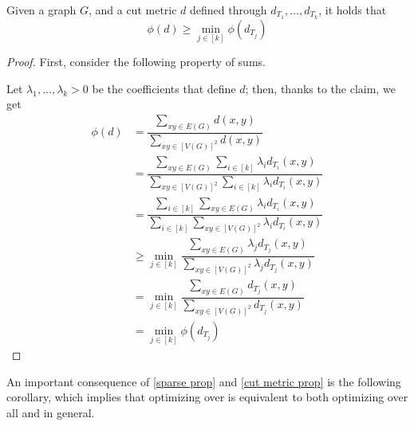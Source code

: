 \documentclass[a4paper, 12pt]{report}
\begin{document}
    \begin{framedprop}[label={cut metric prop}]{}
        Given a graph $G$, and a cut metric $d$ defined through $d_{T_1}, \ldots, d_{T_k}$, it holds that $$\phi(d) \ge \min_{j \in [k]}{\phi(d_{T_j})}$$
    \end{framedprop}

    \begin{proof}
        First, consider the following property of sums.


        Let $\lambda_1, \ldots, \lambda_k > 0$ be the coefficients that define $d$; then, thanks to the claim, we get
        \begin{equation*}
            \begin{split}
                \phi(d) &= \dfrac{\sum_{xy \in E(G)}{d(x, y)}}{\sum_{xy \in [V(G)]^2}{d(x, y)}} \\
                        &= \dfrac{\sum_{xy \in E(G)}{\sum_{i \in [k]}{\lambda_i d_{T_i}(x, y)}}}{\sum_{xy \in [V(G)]^2}{\sum_{i \in [k]}{\lambda_i d_{T_i}(x, y)}}} \\
                        &= \dfrac{\sum_{i \in [k]}{\sum_{xy \in E(G)}{\lambda_i d_{T_i}(x, y)}}}{\sum_{i \in [k]}{\sum_{xy \in [V(G)]^2}{\lambda_i d_{T_i}(x, y)}}} \\
                        &\ge \min_{j \in [k]}{\dfrac{\sum_{xy \in E(G)}{\lambda_j d_{T_j}(x,y)}}{\sum_{xy \in [V(G)]^2}{\lambda_j d_{T_j}(x, y)}}} \\
                        &= \min_{j \in [k]}{\dfrac{\sum_{xy \in E(G)}{d_{T_j}(x, y)}}{\sum_{xy \in [V(G)]^2}{d_{T_j}(x,y)}}} \\
                        &= \min_{j \in [k]}{\phi(d_{T_j})}
            \end{split}
        \end{equation*}
    \end{proof}

    An important consequence of \cref{sparse prop} and \cref{cut metric prop} is the following corollary, which implies that optimizing over  is equivalent to both optimizing over all  and  in general.
\end{document}
